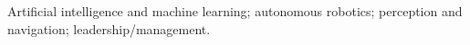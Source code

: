 Artificial intelligence and machine learning; autonomous robotics; perception and navigation; leadership/management.